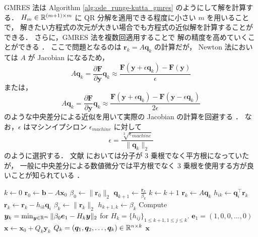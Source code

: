 GMRES 法は Algorithm \ref{alg:ode_runge-kutta_gmres} のようにして解を計算する．
$H_m \in \mathbb{R}^{(m + 1) \times m}$ に QR 分解を適用できる程度に小さい $m$ を用いることで，
解きたい方程式の次元が大きい場合でも方程式の近似解を計算することができる．
さらに，GMRES 法を複数回適用することで
解の精度を高めていくことができる
\cite{Golub2013,Blom2013}．
ここで問題となるのは $\bm{r}_k = A \bm{q}_k$ の計算だが，
Newton 法においては $A$ が Jacobian になるため，
\begin{equation}
    A \bm{q}_k
    =
    \frac{\partial \bm{F}}{\partial \bm{y}}
    \bm{q}_k
    \approx
    \frac{\bm{F}(\bm{y} + \epsilon \bm{q}_k) - \bm{F}(\bm{y})}{\epsilon}
\end{equation}
または，
\begin{equation}
    A \bm{q}_k
    =
    \frac{\partial \bm{F}}{\partial \bm{y}}
    \bm{q}_k
    \approx
    \frac{\bm{F}(\bm{y} + \epsilon \bm{q}_k) - \bm{F}(\bm{y} - \epsilon \bm{q}_k)}{2 \epsilon}
\end{equation}
のような中央差分による近似を用いて実際の Jacobian の計算を回避する
\cite{Blom2016, Blom2013}．
なお，$\epsilon$ はマシンイプシロン $\epsilon_{machine}$ に対して
\begin{equation}
    \epsilon = \frac{\sqrt[3]{\epsilon_{machine}}}{\|\bm{q}_k\|_2}
\end{equation}
のように選択する．
文献 \cite{Blom2016, Blom2013} においては分子が 3 乗根でなく平方根になっていたが，
一般に中央差分による数値微分では平方根でなく 3 乗根を使用する方が良いことが知られている \cite{Press2007}．

\begin{algorithm}[tp]
    \caption{GMRES (Generalized Minimal Residual) \cite{Golub2013,Blom2013}}
    \label{alg:ode_runge-kutta_gmres}
    \begin{algorithmic}[1]
        \State $k \gets 0$
        \State $\bm{r}_0 \gets \bm{b} - A \bm{x}_0$
        \State $\beta_0 \gets \|\bm{r}_0\|_2$
        \State $\bm{q}_{k+1} \gets \frac{\bm{r}_k}{\beta_k}$
        \State $k \gets k + 1$
        \State $\bm{r}_k \gets A \bm{q}_k$
        \State $h_{ik} \gets \bm{q}_i^\top \bm{r}_k$
        \State $\bm{r}_k \gets \bm{r}_k - h_{ik} \bm{q}_i$
        \EndFor
        \State $\beta_k \gets \|\bm{r}_k\|_2$
        \State $h_{k+1,k} \gets \beta_k$
        \EndWhile
        \State Compute $\bm{y}_k = \min_{\bm{y} \in \mathbb{R}^m} \|\beta_0 \bm{e}_1 - H_k \bm{y}\|_2$
        for $H_k = \{h_{ij}\}_{1 \le k + 1, 1 \le j \le k}$.
        \Comment $\bm{e}_1 = (1, 0, 0, \ldots, 0)$
        \State $\bm{x} \gets \bm{x}_0 + Q_k \bm{y}_k$
        \Comment $Q_k = (\bm{q}_1, \bm{q}_2, \ldots, \bm{q}_k) \in \mathbb{R}^{n \times k}$
        \State \Return $\bm{x}$
        \EndProcedure
    \end{algorithmic}
\end{algorithm}

